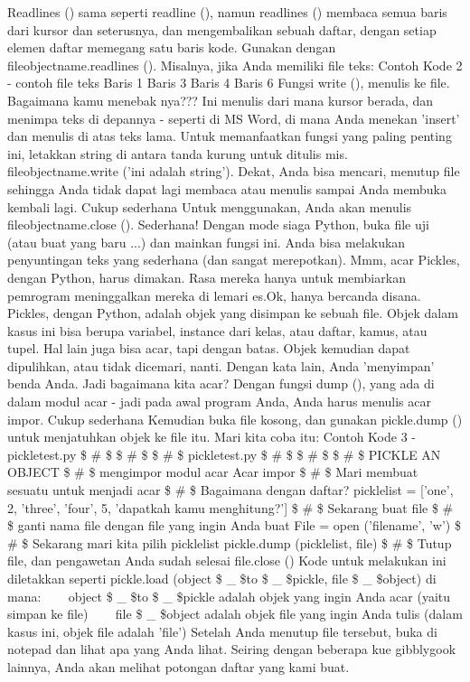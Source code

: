 Readlines () sama seperti readline (), namun readlines () membaca semua baris dari kursor dan seterusnya, dan mengembalikan sebuah daftar, dengan setiap elemen daftar memegang satu baris kode. Gunakan dengan fileobjectname.readlines (). Misalnya, jika Anda memiliki file teks: 
Contoh Kode 2 - contoh file teks 
Baris 1  
Baris 3  
Baris 4  
Baris 6 
Fungsi write (), menulis ke file. Bagaimana kamu menebak nya??? Ini menulis dari mana kursor berada, dan menimpa teks di depannya - seperti di MS Word, di mana Anda menekan 'insert' dan menulis di atas teks lama. Untuk memanfaatkan fungsi yang paling penting ini, letakkan string di antara tanda kurung untuk ditulis mis. fileobjectname.write ('ini adalah string'). \hspace*{0.5in} Dekat, Anda bisa mencari, menutup file sehingga Anda tidak dapat lagi membaca atau menulis sampai Anda membuka kembali lagi. Cukup sederhana Untuk menggunakan, Anda akan menulis fileobjectname.close (). Sederhana! Dengan mode siaga Python, buka file uji (atau buat yang baru ...) dan mainkan fungsi ini. Anda bisa melakukan penyuntingan teks yang sederhana (dan sangat merepotkan). 
Mmm, acar Pickles, dengan Python, harus dimakan. Rasa mereka hanya untuk membiarkan pemrogram meninggalkan mereka di lemari es.Ok, hanya bercanda disana. Pickles, dengan Python, adalah objek yang disimpan ke sebuah file. Objek dalam kasus ini bisa berupa variabel, instance dari kelas, atau daftar, kamus, atau tupel. Hal lain juga bisa acar, tapi dengan batas. Objek kemudian dapat dipulihkan, atau tidak dicemari, nanti. Dengan kata lain, Anda 'menyimpan' benda Anda. Jadi bagaimana kita acar? Dengan fungsi dump (), yang ada di dalam modul acar - jadi pada awal program Anda, Anda harus menulis acar impor. Cukup sederhana Kemudian buka file kosong, dan gunakan pickle.dump () untuk menjatuhkan objek ke file itu. Mari kita coba itu: 
Contoh Kode 3 - pickletest.py 
 \$  \#  \$ \$  \#  \$ \$  \#  \$ pickletest.py  
 \$  \#  \$ \$  \#  \$ \$  \#  \$ PICKLE AN OBJECT 
 \$  \#  \$ mengimpor modul acar  
Acar impor 
 \$  \#  \$ Mari membuat sesuatu untuk menjadi acar  
 \$  \#  \$ Bagaimana dengan daftar?  
picklelist = ['one', 2, 'three', 'four', 5, 'dapatkah kamu menghitung?']
 \$  \#  \$ Sekarang buat file  
 \$  \#  \$ ganti nama file dengan file yang ingin Anda buat 
File = open ('filename', 'w') 
 \$  \#  \$ Sekarang mari kita pilih picklelist 
pickle.dump (picklelist, file) 
 \$  \#  \$ Tutup file, dan pengawetan Anda sudah selesai  
file.close () 
Kode untuk melakukan ini diletakkan seperti pickle.load (object \$  \_  \$to \$  \_  \$pickle, file \$  \_  \$object) di mana: 
~~~ object \$  \_  \$to \$  \_  \$pickle adalah objek yang ingin Anda acar (yaitu simpan ke file)  
~~~ file \$  \_  \$object adalah objek file yang ingin Anda tulis (dalam kasus ini, objek file adalah 'file') 
Setelah Anda menutup file tersebut, buka di notepad dan lihat apa yang Anda lihat. Seiring dengan beberapa kue gibblygook lainnya, Anda akan melihat potongan daftar yang kami buat.

